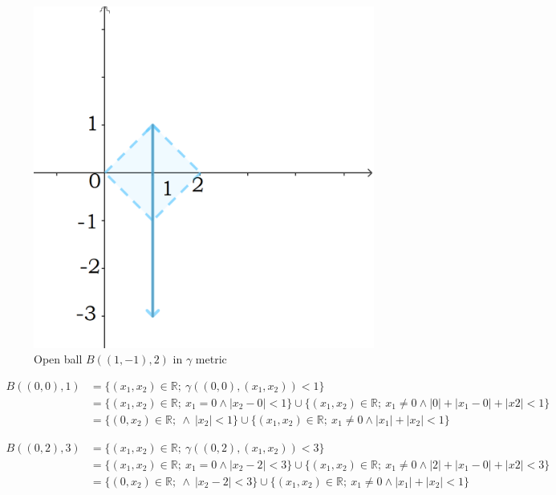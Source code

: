 \documentclass[12pt]{article}
\begin{document}
	\begin{figure}
		\centering
		\includegraphics[scale=0.20] {graph9}
		\caption{\label{fig:9} Open ball $B((1,-1), 2) $ in $\gamma$ metric }
	\end{figure}
	\begin{align*}
		B((0,0), 1) &= \{(x_{1}, x_{2}) \in \mathbb{R}; \ \gamma((0,0),(x_{1}, x_{2}))<1\} \\
		&= \{(x_{1}, x_{2}) \in \mathbb{R}; \ x_{1} = 0 \land |x_{2}-0|<1\} \cup \{(x_{1}, x_{2}) \in \mathbb{R}; \ x_{1} \neq 0 \land |0| + |x_{1}-0| + |x{2}|<1\} \\
		&= \{(0, x_{2}) \in \mathbb{R}; \ \land \ |x_{2}|<1\} \cup \{(x_{1}, x_{2}) \in \mathbb{R}; \ x_{1} \neq 0 \land |x_{1}| + |x_{2}|<1\}
	\end{align*}

	\begin{align*}
	B((0,2), 3) &= \{(x_{1}, x_{2}) \in \mathbb{R}; \ \gamma((0,2),(x_{1}, x_{2}))<3\} \\
	&= \{(x_{1}, x_{2}) \in \mathbb{R}; \ x_{1} = 0 \land |x_{2}-2|<3\} \cup \{(x_{1}, x_{2}) \in \mathbb{R}; \ x_{1} \neq 0 \land |2| + |x_{1}-0| + |x{2}|<3\} \\
	&= \{(0, x_{2}) \in \mathbb{R}; \ \land \ |x_{2}-2|<3\} \cup \{(x_{1}, x_{2}) \in \mathbb{R}; \ x_{1} \neq 0 \land |x_{1}| + |x_{2}|<1\}
	\end{align*}
\end{document}
